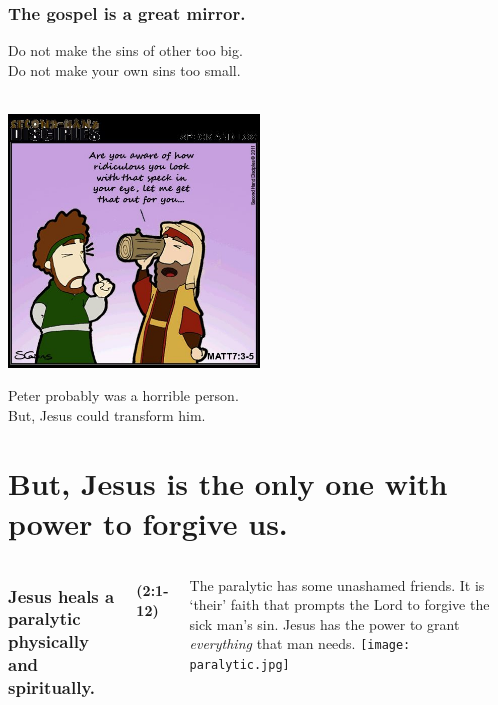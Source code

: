 \documentclass{beamer}
\begin{document}
\begin{frame}
\frametitle{The gospel is a great mirror.}
Do not make the sins of other too big.\\
Do not make your own sins too small.\\~\\
\begin{center}
\includegraphics[width=0.5\textwidth]{graphics/beam.jpg}\\
\end{center}
Peter probably was a horrible person.\\
But, Jesus could transform him.
\end{frame}

\section{But, Jesus is the only one with power to forgive us.}
\begin{frame}
\begin{columns}
\column{5cm}
\frametitle{Jesus heals a paralytic physically and spiritually.}
\framesubtitle{(2:1-12)}
The paralytic has some unashamed friends.
It is `their' faith that prompts the Lord to forgive the sick man's sin.
Jesus has the power to grant \emph{everything} that man needs.
\column{5cm}
\texttt{[image: paralytic.jpg]}
\end{columns}
\end{frame}
\end{document}
